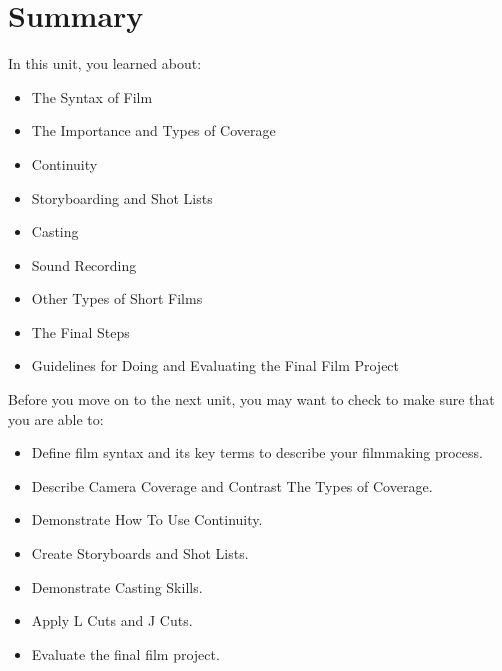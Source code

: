 \documentclass[
  letterpaper,
  DIV=11,
  numbers=noendperiod]{scrreprt}
\providecommand{\tightlist}{%
  \setlength{\itemsep}{0pt}\setlength{\parskip}{0pt}}\usepackage{longtable,booktabs,array}
\begin{document}
\section*{Summary}\label{summary-8}


In this unit, you learned about:

\begin{itemize}
\tightlist
\item
  The Syntax of Film
\item
  The Importance and Types of Coverage
\item
  Continuity
\item
  Storyboarding and Shot Lists
\item
  Casting
\item
  Sound Recording
\item
  Other Types of Short Films
\item
  The Final Steps
\item
  Guidelines for Doing and Evaluating the Final Film Project
\end{itemize}

\begin{tcolorbox}[enhanced jigsaw, titlerule=0mm, leftrule=.75mm, bottomrule=.15mm, colback=white, left=2mm, opacitybacktitle=0.6, title={Checking Your Learning}, colbacktitle=quarto-callout-note-color!10!white, colframe=quarto-callout-note-color-frame, bottomtitle=1mm, toptitle=1mm, opacityback=0, rightrule=.15mm, breakable, arc=.35mm, toprule=.15mm, coltitle=black]

Before you move on to the next unit, you may want to check to make sure
that you are able to:

\begin{itemize}
\tightlist
\item
  Define film syntax and its key terms to describe your filmmaking
  process.
\item
  Describe Camera Coverage and Contrast The Types of Coverage.
\item
  Demonstrate How To Use Continuity.
\item
  Create Storyboards and Shot Lists.
\item
  Demonstrate Casting Skills.
\item
  Apply L Cuts and J Cuts.
\item
  Evaluate the final film project.
\end{itemize}

\end{tcolorbox}
\end{document}
